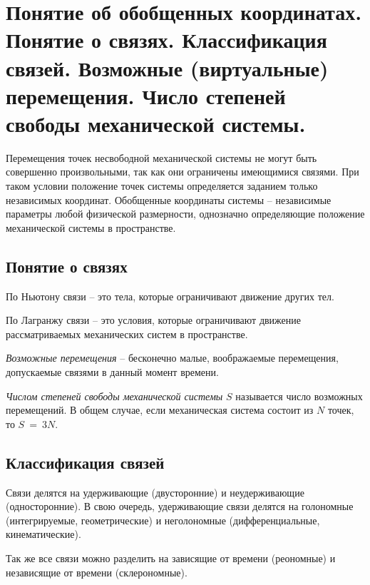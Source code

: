 \chapter{Понятие об обобщенных координатах. Понятие о связях. Классификация
связей. Возможные (виртуальные) перемещения. Число степеней свободы
механической системы.}

Перемещения точек несвободной механической системы не могут быть совершенно
произвольными, так как они ограничены имеющимися связями. При таком условии
положение точек системы определяется заданием только независимых координат.
Обобщенные координаты системы -- независимые параметры любой физической
размерности, однозначно определяющие положение механической системы в
пространстве.

\section{Понятие о связях}

По Ньютону связи -- это тела, которые ограничивают движение других тел.

По Лагранжу связи -- это условия, которые ограничивают движение рассматриваемых
механических систем в пространстве.

\emph{Возможные перемещения} -- бесконечно малые, воображаемые перемещения,
допускаемые связями в данный момент времени.

\emph{Числом степеней свободы механической системы} \( S \) называется число
возможных перемещений. В общем случае, если механическая система состоит из
\( N \) точек, то \( S~=~3N \).

\section{Классификация связей}
Связи делятся на удерживающие (двусторонние) и неудерживающие (односторонние).
В свою очередь, удерживающие связи делятся на голономные (интегрируемые,
геометрические) и неголономные (дифференциальные, кинематические).

Так же все связи можно разделить на зависящие от времени (реономные) и
независящие от времени (склерономные).

\newpage
